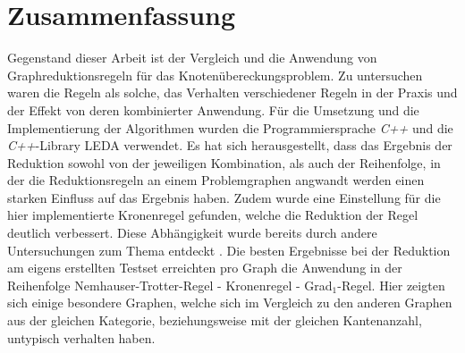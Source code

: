 \chapter*{Zusammenfassung}
Gegenstand dieser Arbeit ist der Vergleich und die Anwendung von Graphreduktionsregeln für das Knotenübereckungsproblem. Zu untersuchen waren die Regeln als solche, das Verhalten verschiedener Regeln in der Praxis und der Effekt von deren kombinierter Anwendung. Für die Umsetzung und die Implementierung der Algorithmen wurden die Programmiersprache \emph{C++} und die \emph{C++}-Library LEDA verwendet. Es hat sich herausgestellt, dass das Ergebnis der Reduktion sowohl von der jeweiligen Kombination, als auch der Reihenfolge, in der die Reduktionsregeln an einem Problemgraphen angwandt werden einen starken Einfluss auf das Ergebnis haben. Zudem wurde eine Einstellung für die hier implementierte Kronenregel gefunden, welche die Reduktion der Regel deutlich verbessert. Diese Abhängigkeit wurde bereits durch andere Untersuchungen zum Thema entdeckt \cite{paper:7}. Die besten Ergebnisse bei der Reduktion am eigens erstellten Testset erreichten pro Graph die Anwendung in der Reihenfolge Nemhauser-Trotter-Regel - Kronenregel - Grad$_{1}$-Regel. Hier zeigten sich einige besondere Graphen, welche sich im Vergleich zu den anderen Graphen aus der gleichen Kategorie, beziehungsweise mit der gleichen Kantenanzahl, untypisch verhalten haben. 